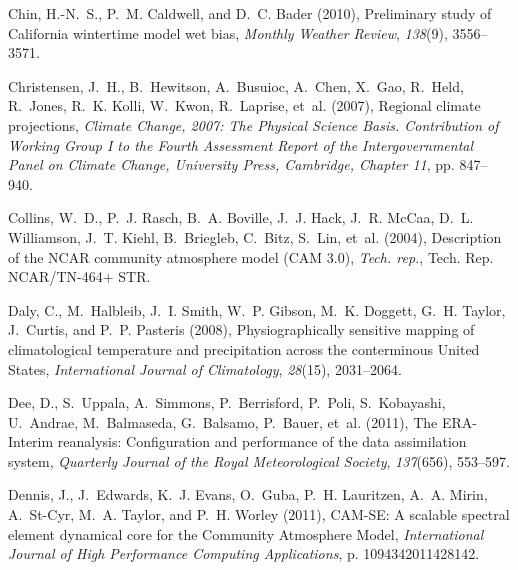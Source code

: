 \documentclass[ms]{agutex}   %
\begin{document}
\begin{article}
\begin{thebibliography}{84}
Chin, H.-N.~S., P.~M. Caldwell, and D.~C. Bader (2010), {Preliminary study of
  California wintertime model wet bias}, \textit{Monthly Weather Review},
  \textit{138}(9), 3556--3571.

Christensen, J.~H., B.~Hewitson, A.~Busuioc, A.~Chen, X.~Gao, R.~Held,
  R.~Jones, R.~K. Kolli, W.~Kwon, R.~Laprise, et~al. (2007), Regional climate
  projections, \textit{Climate Change, 2007: The Physical Science Basis.
  Contribution of Working Group I to the Fourth Assessment Report of the
  Intergovernmental Panel on Climate Change, University Press, Cambridge,
  Chapter 11}, pp. 847--940.

Collins, W.~D., P.~J. Rasch, B.~A. Boville, J.~J. Hack, J.~R. McCaa, D.~L.
  Williamson, J.~T. Kiehl, B.~Briegleb, C.~Bitz, S.~Lin, et~al. (2004),
  {Description of the NCAR community atmosphere model (CAM 3.0)}, \textit{Tech.
  rep.}, Tech. Rep. NCAR/TN-464+ STR.

Daly, C., M.~Halbleib, J.~I. Smith, W.~P. Gibson, M.~K. Doggett, G.~H. Taylor,
  J.~Curtis, and P.~P. Pasteris (2008), {Physiographically sensitive mapping of
  climatological temperature and precipitation across the conterminous United
  States}, \textit{International Journal of Climatology}, \textit{28}(15),
  2031--2064.

Dee, D., S.~Uppala, A.~Simmons, P.~Berrisford, P.~Poli, S.~Kobayashi,
  U.~Andrae, M.~Balmaseda, G.~Balsamo, P.~Bauer, et~al. (2011), {The
  ERA-Interim reanalysis: Configuration and performance of the data
  assimilation system}, \textit{Quarterly Journal of the Royal Meteorological
  Society}, \textit{137}(656), 553--597.

Dennis, J., J.~Edwards, K.~J. Evans, O.~Guba, P.~H. Lauritzen, A.~A. Mirin,
  A.~St-Cyr, M.~A. Taylor, and P.~H. Worley (2011), {CAM-SE: A scalable
  spectral element dynamical core for the Community Atmosphere Model},
  \textit{International Journal of High Performance Computing Applications}, p.
  1094342011428142.


\end{thebibliography}
\end{article}
\end{document}
